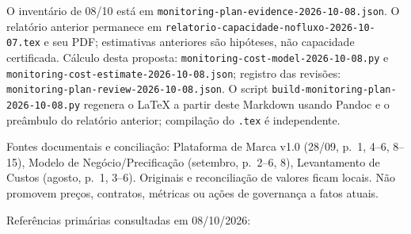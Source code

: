 \documentclass[10pt,a4paper]{article}
\begin{document}
O inventário de 08/10 está em
{\footnotesize\ttfamily\nolinkurl{monitoring-plan-evidence-2026-10-08.json}}. O relatório anterior
permanece em {\footnotesize\ttfamily\nolinkurl{relatorio-capacidade-nofluxo-2026-10-07.tex}} e seu
PDF; estimativas anteriores são hipóteses, não capacidade certificada.
Cálculo desta proposta: {\footnotesize\ttfamily\nolinkurl{monitoring-cost-model-2026-10-08.py}} e
{\footnotesize\ttfamily\nolinkurl{monitoring-cost-estimate-2026-10-08.json}}; registro das
revisões: {\footnotesize\ttfamily\nolinkurl{monitoring-plan-review-2026-10-08.json}}. O script
{\footnotesize\ttfamily\nolinkurl{build-monitoring-plan-2026-10-08.py}} regenera o LaTeX a partir
deste Markdown usando Pandoc e o preâmbulo do relatório anterior;
compilação do {\footnotesize\ttfamily\nolinkurl{.tex}} é independente.

Fontes documentais e conciliação: Plataforma de Marca v1.0 (28/09, p.~1,
4--6, 8--15), Modelo de Negócio/Precificação (setembro, p.~2--6, 8),
Levantamento de Custos (agosto, p.~1, 3--6). Originais e reconciliação
de valores ficam locais. Não promovem preços, contratos, métricas ou
ações de governança a fatos atuais.

Referências primárias consultadas em 08/10/2026:
\end{document}
